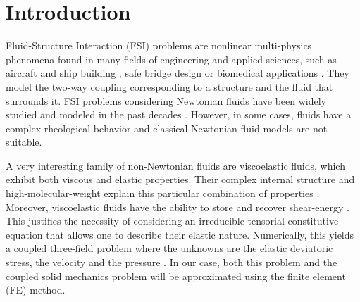 \documentclass[11pt,english]{article}
\begin{document}
%
%
\section{Introduction}

Fluid-Structure Interaction (FSI) problems are nonlinear multi-physics phenomena found in many fields of engineering and applied sciences, such as aircraft and ship building \cite{FSIaeroelastic}, safe bridge design or biomedical applications \cite{FSIBiomedical}. They model the two-way coupling corresponding to a structure and the fluid that surrounds it. FSI problems considering Newtonian fluids have been widely studied and modeled in the past decades \cite{kuttler2008fixed,richter2010,richter2017}. However, in some cases, fluids have a complex rheological behavior and classical Newtonian fluid models are not suitable.

A very interesting family of non-Newtonian fluids are viscoelastic fluids, which exhibit both viscous and elastic properties.  Their complex internal structure and high-molecular-weight explain this particular combination of properties \cite{ueda2002viscoelastic}. Moreover, viscoelastic fluids have the ability to store and recover shear-energy \cite{chhabra2011non}. This justifies the necessity of considering an irreducible tensorial constitutive equation that allows one to describe their elastic nature. Numerically, this yields a coupled three-field problem where the unknowns are the elastic deviatoric stress, the velocity and the pressure
\cite{castillo2021stabilised}. In our case, both this problem and the coupled solid mechanics problem will be approximated using the finite element (FE) method. 

\end{document}
